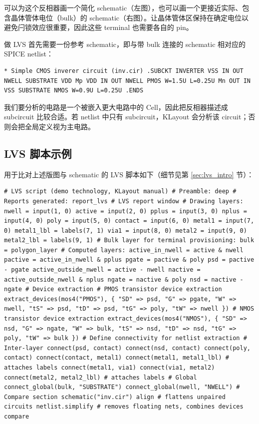 可以为这个反相器画一个简化 schematic（左图），也可以画一个更接近实际、包含晶体管体电位（bulk）的 schematic（右图）。让晶体管体区保持在确定电位以避免闩锁效应很重要，因此这些 terminal 也需要各自的 pin。


做 LVS 首先需要一份参考 schematic，即与带 bulk 连接的 schematic 相对应的 SPICE netlist：

\begin{lstlisting}
* Simple CMOS inverer circuit (inv.cir) .SUBCKT INVERTER VSS IN OUT NWELL SUBSTRATE VDD Mp VDD IN OUT NWELL PMOS W=1.5U L=0.25U Mn OUT IN VSS SUBSTRATE NMOS W=0.9U L=0.25U .ENDS
\end{lstlisting}

我们要分析的电路是一个被嵌入更大电路中的 Cell，因此把反相器描述成 subcircuit 比较合适。若 netlist 中只有 subcircuit，KLayout 会分析该 circuit；否则会把全局定义视为主电路。

\subsection{LVS 脚本示例}

用于比对上述版图与 schematic 的 LVS 脚本如下（细节见第 \ref{sec:lvs_intro} 节）：

\begin{lstlisting}
# LVS script (demo technology, KLayout manual) # Preamble: deep # Reports generated: report_lvs # LVS report window # Drawing layers: nwell = input(1, 0) active = input(2, 0) pplus = input(3, 0) nplus = input(4, 0) poly = input(5, 0) contact = input(6, 0) metal1 = input(7, 0) metal1_lbl = labels(7, 1) via1 = input(8, 0) metal2 = input(9, 0) metal2_lbl = labels(9, 1) # Bulk layer for terminal provisioning: bulk = polygon_layer # Computed layers: active_in_nwell = active & nwell pactive = active_in_nwell & pplus pgate = pactive & poly psd = pactive - pgate active_outside_nwell = active - nwell nactive = active_outside_nwell & nplus ngate = nactive & poly nsd = nactive - ngate # Device extraction # PMOS transistor device extraction extract_devices(mos4("PMOS"), { "SD" => psd, "G" => pgate, "W" => nwell, "tS" => psd, "tD" => psd, "tG" => poly, "tW" => nwell }) # NMOS transistor device extraction extract_devices(mos4("NMOS"), { "SD" => nsd, "G" => ngate, "W" => bulk, "tS" => nsd, "tD" => nsd, "tG" => poly, "tW" => bulk }) # Define connectivity for netlist extraction # Inter-layer connect(psd, contact) connect(nsd, contact) connect(poly, contact) connect(contact, metal1) connect(metal1, metal1_lbl) # attaches labels connect(metal1, via1) connect(via1, metal2) connect(metal2, metal2_lbl) # attaches labels # Global connect_global(bulk, "SUBSTRATE") connect_global(nwell, "NWELL") # Compare section schematic("inv.cir") align # flattens unpaired circuits netlist.simplify # removes floating nets, combines devices compare
\end{lstlisting}

